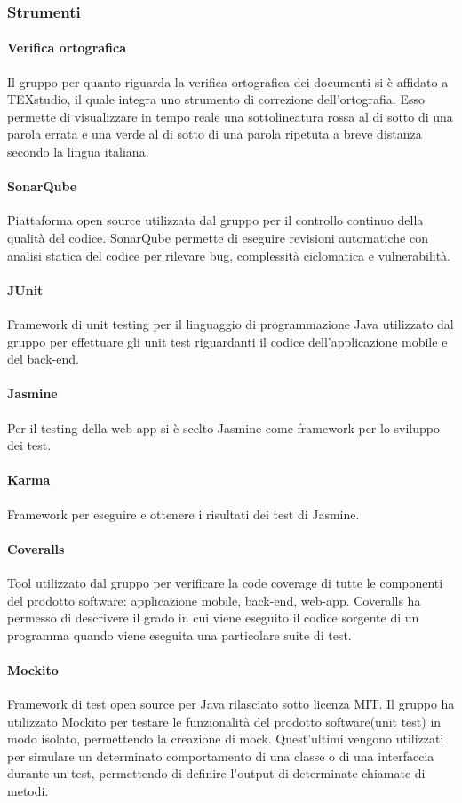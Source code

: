 \subsubsection{Strumenti}

\paragraph{Verifica ortografica}
Il gruppo \Gruppo{} per quanto riguarda la verifica ortografica dei documenti si è affidato a TEXstudio, il quale integra uno strumento di correzione dell'ortografia. Esso permette di visualizzare in tempo reale una sottolineatura rossa al di sotto di una parola errata e una verde al di sotto di una parola ripetuta a breve distanza secondo la lingua italiana.  
\paragraph{SonarQube}
Piattaforma open source utilizzata dal gruppo per il controllo continuo della qualità del codice. SonarQube permette di eseguire revisioni automatiche con analisi statica del codice per rilevare bug, complessità ciclomatica e vulnerabilità.
\paragraph{JUnit}
Framework di unit testing per il linguaggio di programmazione Java utilizzato dal gruppo per effettuare gli unit test riguardanti il codice dell'applicazione mobile e del back-end.
\paragraph{Jasmine}
Per il testing della web-app si è scelto Jasmine come framework per lo sviluppo dei test.
\paragraph{Karma}
Framework per eseguire e ottenere i risultati dei test di Jasmine.
\paragraph{Coveralls}
Tool utilizzato dal gruppo per verificare la code coverage di tutte le componenti del prodotto software: applicazione mobile, back-end, web-app. Coveralls ha permesso di descrivere il grado in cui viene eseguito il codice sorgente di un programma quando viene eseguita una particolare suite di test.
\paragraph{Mockito}
Framework di test open source per Java rilasciato sotto licenza MIT. Il gruppo ha utilizzato Mockito per testare le funzionalità del prodotto software(unit test) in modo isolato, permettendo la creazione di 
mock. Quest'ultimi vengono utilizzati per simulare un determinato comportamento di una classe o di una interfaccia durante un test, permettendo di definire l'output di determinate chiamate di metodi.
